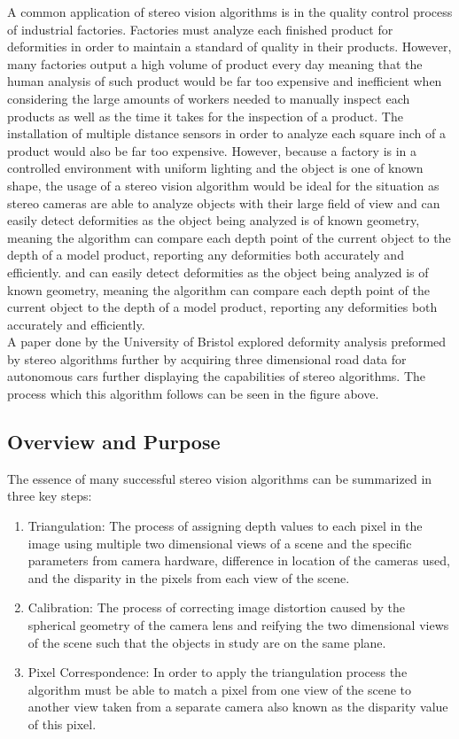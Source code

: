 \documentclass[11pt]{scrartcl}
\begin{document}
A common application of stereo vision algorithms is in the quality
control process of industrial factories. Factories must analyze each
finished product for deformities in order to maintain a standard of quality in their 
products. However, many factories output a high volume of product every day meaning that
the human analysis of such product would be far too expensive and inefficient when
considering the large amounts of workers needed to manually inspect each products
as well as the time it takes for the inspection of a product. The installation of multiple
distance sensors in order to analyze each square inch of a product would also be far too expensive. 
However, because a factory is in a controlled environment with uniform lighting and the object is one
of known shape, the usage of a stereo vision algorithm would be ideal for the situation as stereo cameras 
are able to analyze objects with their large field of view and can easily detect deformities as the object 
being analyzed is of known geometry, meaning the algorithm can compare each depth point of the current object 
to the depth of a model product, reporting any deformities both accurately and efficiently.  and can easily detect deformities as the object 
being analyzed is of known geometry, meaning the algorithm can compare each depth point of the current object 
to the depth of a model product, reporting any deformities both accurately and efficiently. \\

A paper done by the University of Bristol explored deformity analysis preformed by stereo algorithms
further by acquiring three dimensional road data for autonomous cars further displaying the 
capabilities of stereo algorithms. The process which this algorithm follows can be seen in the 
figure above. 

\subsection{Overview and Purpose}

The essence of many successful stereo vision algorithms can be summarized in three key steps:
{\begin{enumerate}

    \item Triangulation: The process of assigning depth values to each pixel in the image 
        using multiple two dimensional views of a scene and the specific parameters from
        camera hardware, difference in location of the cameras used, and the disparity in the 
        pixels from each view of the scene.
    \item Calibration: The process of correcting image distortion caused by the 
        spherical geometry of the camera lens 
        and reifying the two dimensional views of the scene such that 
        the objects in study are on the same plane. 
    \item Pixel Correspondence: In order to apply the triangulation process the algorithm must be 
        able to match a pixel from one view of the scene to another view taken from a separate camera 
        also known as the disparity value of this pixel.  
\end{enumerate}}
\end{document}
